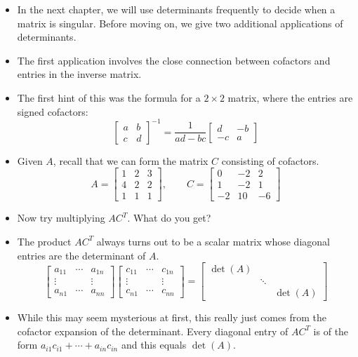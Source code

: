 \documentclass[11pt,oneside]{amsbook}
\theoremstyle{definition}
\theoremstyle{plain}
\theoremstyle{definition}
\theoremstyle{remark}
\numberwithin{equation}{section}
\numberwithin{figure}{section}
\begin{document}
\begin{itemize}
\item In the next chapter, we will use determinants frequently to decide when a matrix is singular. Before moving on, we give two additional applications of determinants.
\item The first application involves the close connection between cofactors and entries in the inverse matrix.
\item The first hint of this was the formula for a $2\times 2$ matrix, where the entries are signed cofactors:
  \[\begin{bmatrix}a&b\\c&d\end{bmatrix}^{-1}
    =\frac{1}{ad-bc}\begin{bmatrix}d&-b\\-c&a\end{bmatrix}
  \]
\item Given $A$, recall that we can form the matrix $C$ consisting of cofactors.
  \[A=\begin{bmatrix}1&2&3\\4&2&2\\1&1&1\end{bmatrix},\qquad
    C=\begin{bmatrix}0&-2&2\\1&-2&1\\-2&10&-6\end{bmatrix}
  \]
\item Now try multiplying $AC^T$. What do you get?
\item The product $AC^T$ always turns out to be a scalar matrix whose diagonal entries are the determinant of $A$.
  \[\begin{bmatrix}
      a_{11}&\cdots&a_{1n}\\
      \vdots&&\vdots\\
      a_{n1}&\cdots&a_{nn}
    \end{bmatrix}
    \begin{bmatrix}
      c_{11}&\cdots&c_{1n}\\
      \vdots&&\vdots\\
      c_{n1}&\cdots&c_{nn}
    \end{bmatrix}
    =\begin{bmatrix}
      \det(A)\\&\ddots\\&&\det(A)
    \end{bmatrix}
    \]
\item While this may seem mysterious at first, this really just comes from the cofactor expansion of the determinant. Every diagonal entry of $AC^T$ is of the form $a_{i1}c_{i1}+\cdots+a_{in}c_{in}$ and this equals $\det(A)$.

\end{itemize}
\end{document}
